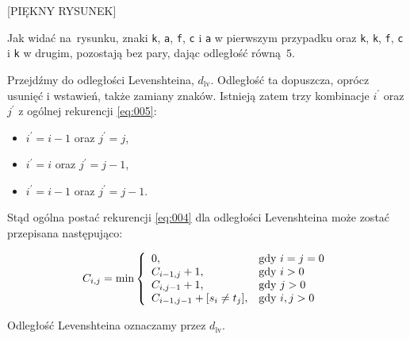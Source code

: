 \documentclass{praca1}
\begin{document}
[PIĘKNY RYSUNEK]

Jak widać na~rysunku, znaki \verb|k|, \verb|a|, \verb|f|, \verb|c| i \verb|a| w pierwszym przypadku oraz \verb|k|, \verb|k|, \verb|f|, \verb|c| i \verb|k| w drugim, pozostają bez pary, dając odległość równą~$5$.


Przejdźmy do odległości Levenshteina, $d_{\mathrm{lv}}$. Odległość ta dopuszcza, oprócz usunięć i wstawień, także zamiany znaków. Istnieją zatem  trzy kombinacje $i^\prime$ oraz $j^\prime$ z ogólnej rekurencji \ref{eq:005}:
\begin{itemize}
\item $i^\prime = i - 1$ oraz $j^\prime = j$,
\item $i^\prime = i$ oraz $j^\prime = j - 1$,
\item $i^\prime = i - 1$ oraz $j^\prime = j - 1$.
\end{itemize}

Stąd ogólna postać rekurencji \ref{eq:004} dla odległości Levenshteina może zostać przepisana następująco:

\begin{equation}
\label{eq:006}
C_{i,j} = \min\left\{
\begin{array}{l l}     
    0, & \text{gdy } i = j = 0\\
    C_{i-1, j} + 1, & \text{gdy } i > 0 \\
    C_{i, j-1} + 1, & \text{gdy } j > 0 \\
    C_{i-1, j-1} + [s_{i}\neq t_{j}], & \text{gdy } i, j > 0
\end{array}\right.
\end{equation}

Odległość Levenshteina oznaczamy przez $d_{\mathrm{lv}}$.

\end{document}
